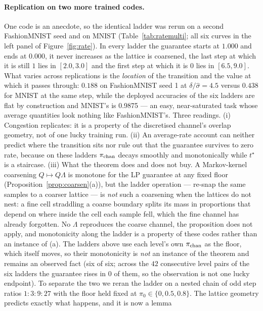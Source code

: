 \documentclass[11pt]{article}
\begin{document}
\paragraph{Replication on two more trained codes.}
One code is an anecdote, so the identical ladder was rerun on a second FashionMNIST seed and on
MNIST (Table~\ref{tab:ratemulti}; all six curves in the left panel of Figure~\ref{fig:rate}).
In every ladder the guarantee starts at $1.000$ and ends at $0.000$, it never increases as the
lattice is coarsened, the last step at which it is still $1$ lies in $[2.0,3.0]$ and the first
step at which it is $0$ lies in $[6.5,9.0]$. What varies across replications is the
\emph{location} of the transition and the value at which it passes through:
$0.188$ on FashionMNIST
seed 1 at $\delta/\hat\sigma=4.5$ versus $0.438$
for MNIST at the same step, while the deployed accuracies of the six ladders are flat by
construction and MNIST's is 0.9875 --- an easy,
near-saturated task whose average quantities look nothing like FashionMNIST's. Three readings.
(i) Congestion replicates: it is a property of the discretised channel's overlap geometry, not of
one lucky training run. (ii) An average-rate account can neither predict where the transition
sits nor rule out that the guarantee survives to zero rate, because on these ladders
$\pi_{\rm chan}$ decays smoothly and monotonically while $t^\star$ is a staircase.
(iii) What the theorem does and does not buy. A Markov-kernel coarsening $Q\mapsto Q\Lambda$ is monotone for the LP guarantee at any
fixed floor (Proposition~\ref{prop:coarsen}(a)), but the ladder operation --- re-snap the same
samples to a coarser lattice --- is \emph{not} such a coarsening when the lattices do not nest:
a fine cell straddling a coarse boundary splits its mass in proportions that depend on where
inside the cell each sample fell, which the fine channel has already forgotten. No $\Lambda$
reproduces the coarse channel, the proposition does not apply, and monotonicity along the
ladder is a property of these codes rather than an instance of (a). The ladders above use each level's own $\pi_{\rm chan}$ as the floor, which itself moves,
so their monotonicity is \emph{not} an instance of the theorem and remains an observed fact
(six of six; across the $42$ consecutive level pairs of the six ladders the guarantee rises in
$0$ of them, so the observation is not one lucky endpoint). To separate the two we reran the ladder on a nested chain of odd step ratios
$1{:}3{:}9{:}27$ with the floor held fixed at $\pi_0\in\{0,0.5,0.8\}$. The lattice geometry predicts exactly what happens, and it is now a lemma
\end{document}
